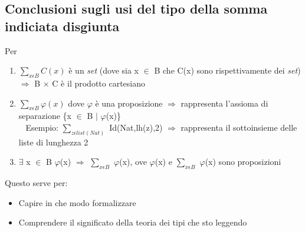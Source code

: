 \subsection{Conclusioni sugli usi del tipo della somma indiciata disgiunta}
\label{subsec:conclusioni-usi-somma-indiciata-disgiunta}
Per
\begin{enumerate}
\item $\sum\limits_{x \epsilon B}C(x)$ \`e un \textit{set} (dove sia x $\in$ B che C(x) sono rispettivamente dei \textit{set}) $\Rightarrow$ B $\times$ C \`e il prodotto cartesiano
\item $\sum\limits_{x \epsilon B}\varphi(x)$ dove $\varphi$ \`e una proposizione $\Rightarrow$ rappresenta l'assioma di separazione \{x $\in$ B $|$ $\varphi$(x)\}\\\
\noindent
Esempio:
$\sum\limits_{z \epsilon list(Nat)}$ Id(Nat,lh(z),2) $\Rightarrow$ rappresenta il sottoinsieme delle liste di lunghezza 2
\item $\exists$ x $\in$ B $\varphi$(x) $\Rightarrow$ $\sum\limits_{x \epsilon B}$ $\varphi$(x), ove $\varphi$(x) e $\sum\limits_{x \epsilon B}$ $\varphi$(x) sono proposizioni
\end{enumerate}
\noindent
Questo serve per:
\begin{itemize}
\item Capire in che modo formalizzare
\item Comprendere il significato della teoria dei tipi che sto leggendo
\end{itemize}


